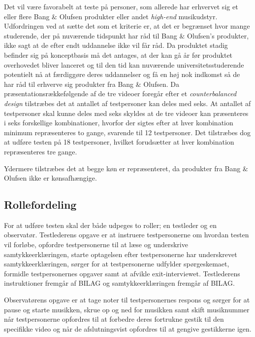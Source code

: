 Det vil være favorabelt at teste på personer, som allerede har erhvervet sig et eller flere Bang $\&$ Olufsen produkter eller andet \textit{high-end} musikudstyr. Udfordringen ved at sætte det som et kriterie er, at det er begrænset hvor mange studerende, der på nuværende tidspunkt har råd til Bang $\&$ Olufsen's produkter, ikke sagt at de efter endt uddannelse ikke vil får råd. Da produktet stadig befinder sig på konceptbasis må det antages, at der kan gå år før produktet overhovedet bliver lanceret og til den tid kan nuværende universitetsstuderende potentielt nå at færdiggøre deres uddannelser og få en høj nok indkomst så de har råd til erhverve sig produkter fra Bang $\&$ Olufsen. \blankline
%        
Da præsentationsrækkefølgende af de tre videoer foregår efter et \textit{counterbalanced design} tilstræbes det at antallet af testpersoner kan deles med seks. At antallet af testpersoner skal kunne deles med seks skyldes at de tre videoer kan præsenteres i seks forskellige kombinationer, hvorfor der sigtes efter at hver kombination minimum repræsenteres to gange, svarende til 12 testpersoner. Det tilstræbes dog at udføre testen på 18 testpersoner, hvilket forudsætter at hver kombination repræsenteres tre gange. 

Ydermere tilstræbes det at begge køn er repræsenteret, da produkter fra Bang $\&$ Olufsen ikke er kønsafhængige. 
%

\subsection{Rollefordeling}
\label{RollerfordelingValgAfGestikker}
%
For at udføre testen skal der både udpeges to roller; en testleder og en observatør. Testlederens opgave er at instruere testpersonerne om hvordan testen vil forløbe, opfordre testpersonerne til at læse og underskrive samtykkeerklæringen, starte optagelsen efter testpersonerne har underskrevet samtykkeerklæringen, sørger for at testpersonerne udfylder spørgeskemaet, formidle testpersonernes opgaver samt at afvikle exit-interviewet. Testlederens instruktioner fremgår af BILAG og samtykkeerklæringen fremgår af BILAG. 

Observatørens opgave er at tage noter til testpersonernes respons og sørger for at pause og starte musikken, skrue op og ned for musikken samt skift musiknummer når testpersonerne opfordres til at forbedre deres fortrukne gestik til den specifikke video og når de afslutningsvist opfordres til at gengive gestikkerne igen. 

